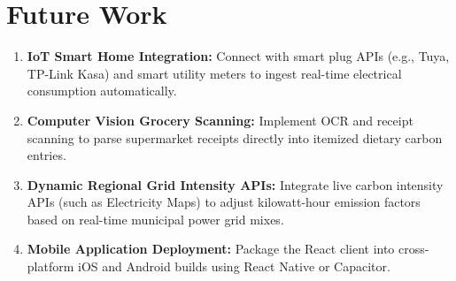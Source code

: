 \documentclass[12pt,a4paper]{article}
\begin{document}
\section{Future Work}
\begin{enumerate}
    \item \textbf{IoT Smart Home Integration:} Connect with smart plug APIs (e.g., Tuya, TP-Link Kasa) and smart utility meters to ingest real-time electrical consumption automatically.
    \item \textbf{Computer Vision Grocery Scanning:} Implement OCR and receipt scanning to parse supermarket receipts directly into itemized dietary carbon entries.
    \item \textbf{Dynamic Regional Grid Intensity APIs:} Integrate live carbon intensity APIs (such as Electricity Maps) to adjust kilowatt-hour emission factors based on real-time municipal power grid mixes.
    \item \textbf{Mobile Application Deployment:} Package the React client into cross-platform iOS and Android builds using React Native or Capacitor.
\end{enumerate}
\end{document}

